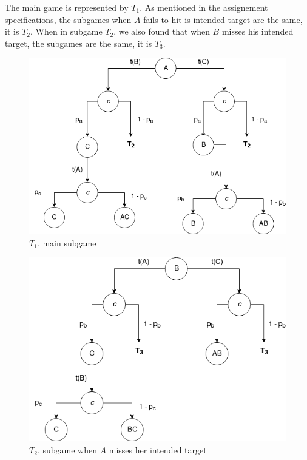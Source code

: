 \documentclass[letterpaper]{article}
\begin{document}
The main game is represented by
$T_1$. As mentioned in the
assignement specifications, the subgames when $A$ fails to hit is intended
target are the same,  it is $T_2$. When in subgame $T_2$, we also found
that when $B$ misses his intended target,
the subgames are the same, it is $T_3$.

\begin{figure}[!ht]
 \centerline{\includegraphics[scale=0.5]{images/T1}}
 \caption{$T_1$, main subgame}
 \label{fig:t1}
\end{figure}

\begin{figure}[!ht]
 \centerline{\includegraphics[scale=0.5]{images/T2}}
 \caption{$T_2$, subgame when $A$ misses her intended target}
 \label{fig:t2}
\end{figure}
\end{document}
